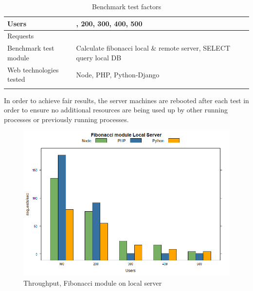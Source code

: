 \documentclass[../thesis.tex]{subfiles}
\begin{document}
\begin{table}[H]
	\caption{Benchmark test factors}
	\centering
	\footnotesize
	\label{tab1}
	\begin{tabular}{!{\color{sapphire}\vrule width 1pt}m{0.22\textwidth}!{\color{black}\vrule width 1pt}m{0.22\textwidth}!{\color{black}\vrule width 1pt}m{0.22\textwidth}!{\color{black}\vrule width 1pt}m{0.22\textwidth}!{\color{sapphire}\vrule width 1pt}}
		\hline
		\Centering Users &
		, 200, 300, 400, 500 \\
		\hline
		\Centering Requests &
		 \\
		\hline
		\Centering Benchmark test module & 
		\Centering Calculate fibonacci local \& remote server, SELECT query local DB \\
		\hline
		\Centering Web technologies tested & 
		\Centering Node, PHP, Python-Django \\
		\hline
		\hline
	\end{tabular}
\end{table}
In order to achieve fair results, the server machines are rebooted after each test in order to ensure no additional resources are being used up by other running processes or previously running processes.
\newpage
	\begin{figure}[H]
	\centering
	\includegraphics[width=1\textwidth]{../images/fibLocalreq.png}
	\caption{Throughput, Fibonacci module on local server}
	\label{rys1}
	\end{figure}
\end{document}
